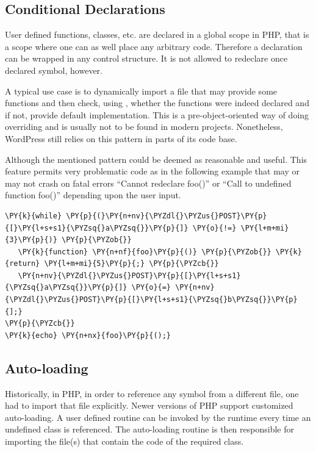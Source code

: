     
    \subsection{Conditional Declarations}
    User defined functions, classes, etc. are declared in 
    a global scope in PHP, that is a scope where one can 
    as well place any arbitrary code. Therefore a declaration 
    can be wrapped in any control structure. 
    It is not allowed to redeclare once declared symbol, however.
    
    A typical use case is to dynamically import a file 
    that may provide some functions and then check, 
    using , whether the functions were 
    indeed declared and if not, provide default implementation.
    This is a pre-object-oriented way of doing overriding and 
    is usually not to be found in modern projects. Nonetheless, 
    WordPress still relies on this pattern in parts of its code base.
    
    Although the mentioned pattern could be deemed as 
    reasonable and useful. This feature permits very problematic 
    code as in the following example that may or may not 
    crash on fatal errors ``Cannot redeclare foo()'' or 
    ``Call to undefined function foo()'' depending upon 
    the user input.
    
\begin{Verbatim}[commandchars=\\\{\}]
\PY{k}{while} \PY{p}{(}\PY{n+nv}{\PYZdl{}\PYZus{}POST}\PY{p}{[}\PY{l+s+s1}{\PYZsq{}a\PYZsq{}}\PY{p}{]} \PY{o}{!=} \PY{l+m+mi}{3}\PY{p}{)} \PY{p}{\PYZob{}}
   \PY{k}{function} \PY{n+nf}{foo}\PY{p}{()} \PY{p}{\PYZob{}} \PY{k}{return} \PY{l+m+mi}{5}\PY{p}{;} \PY{p}{\PYZcb{}}
   \PY{n+nv}{\PYZdl{}\PYZus{}POST}\PY{p}{[}\PY{l+s+s1}{\PYZsq{}a\PYZsq{}}\PY{p}{]} \PY{o}{=} \PY{n+nv}{\PYZdl{}\PYZus{}POST}\PY{p}{[}\PY{l+s+s1}{\PYZsq{}b\PYZsq{}}\PY{p}{];}
\PY{p}{\PYZcb{}}
\PY{k}{echo} \PY{n+nx}{foo}\PY{p}{();}
\end{Verbatim}
    
                
    \subsection{Auto-loading}
    Historically, in PHP, in order to reference any symbol 
    from a different file, one had to import that 
    file explicitly. Newer versions of PHP support  
    customized auto-loading. A user defined routine 
    can be invoked by the runtime every time an 
    undefined class is referenced. 
    The auto-loading routine is then responsible for 
    importing the file(s) that contain the code of the 
    required class. 
    
